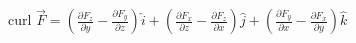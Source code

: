 \documentclass[preview]{standalone}
\begin{document}
\begin{center}
curl $\vec{F} = (\frac{\partial F_{z}}{\partial y} - \frac{\partial F_{y}}{\partial z}) \hat{i} + (\frac{\partial F_{x}}{\partial z} - \frac{\partial F_{z}}{\partial x}) \hat{j} + (\frac{\partial F_{y}}{\partial x} - \frac{\partial F_{x}}{\partial y}) \hat{k}$
\end{center}
\end{document}
